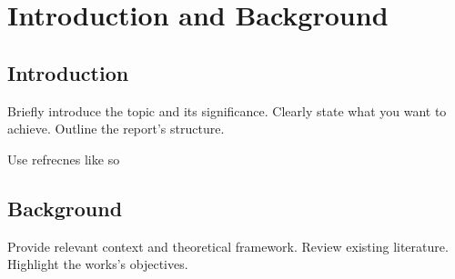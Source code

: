 \section{Introduction and Background}
\subsection{Introduction}
Briefly introduce the topic and its significance. 
Clearly state what you want to achieve. 
Outline the report's structure. 

Use refrecnes like so \cite{efp1,fred1,marie1,marie2,sb1}

\subsection{Background}
Provide relevant context and theoretical framework. 
Review existing literature.
Highlight the works's objectives.